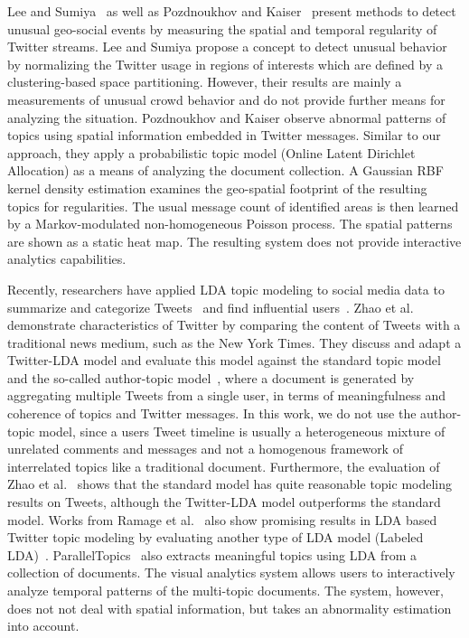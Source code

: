 Lee and Sumiya~\cite{Lee:2010:MGR} as well as Pozdnoukhov and Kaiser~\cite{Pozdnoukhov:2011:SDT} present methods to detect unusual geo-social events by measuring the spatial and temporal regularity of Twitter streams.
Lee and Sumiya propose a concept to detect unusual behavior by normalizing the Twitter usage in regions of interests which are defined by a clustering-based space partitioning.
However, their results are mainly a measurements of unusual crowd behavior and do not provide further means for analyzing the situation.
Pozdnoukhov and Kaiser observe abnormal patterns of topics using spatial information embedded in Twitter messages.
Similar to our approach, they apply a probabilistic topic model (Online Latent Dirichlet Allocation) as a means of analyzing the document collection.
A Gaussian RBF kernel density estimation examines the geo-spatial footprint of the resulting topics for regularities. 
The usual message count of identified areas is then learned by a Markov-modulated non-homogeneous Poisson process.
The spatial patterns are shown as a static heat map.
The resulting system does not provide interactive analytics capabilities.

Recently, researchers have applied LDA topic modeling to social media data to summarize and categorize Tweets~\cite{Zhao:2011:CTA} and find influential users~\cite{Weng:2010:TFT}. 
Zhao et al.~\cite{Zhao:2011:CTA} demonstrate characteristics of Twitter by comparing the content of Tweets with a traditional news medium, such as the New York Times.
They discuss and adapt a Twitter-LDA model and evaluate this model against the standard topic model and the so-called author-topic model~\cite{Steyvers:2004:PAM}, where a document is generated by aggregating multiple Tweets from a single user, in terms of meaningfulness and coherence of topics and Twitter messages.
In this work, we do not use the author-topic model, since a users Tweet timeline is usually a heterogeneous mixture of unrelated comments and messages and not a homogenous framework of interrelated topics like a traditional document.
Furthermore, the evaluation of Zhao et al.~\cite{Zhao:2011:CTA} shows that the standard model has quite reasonable topic modeling results on Tweets, although the Twitter-LDA model outperforms the standard model. 
Works from Ramage et al.~\cite{ramage:2010:CMW} also show promising results in LDA based Twitter topic modeling by evaluating another type of LDA model (Labeled LDA)~\cite{Ramage:2009:LLS}.
ParallelTopics~\cite{Wenwen:2011:PAP} also extracts meaningful topics using LDA from a collection of documents.
The visual analytics system allows users to interactively analyze temporal patterns of the multi-topic documents.
The system, however, does not not deal with spatial information, but takes an abnormality estimation into account.

